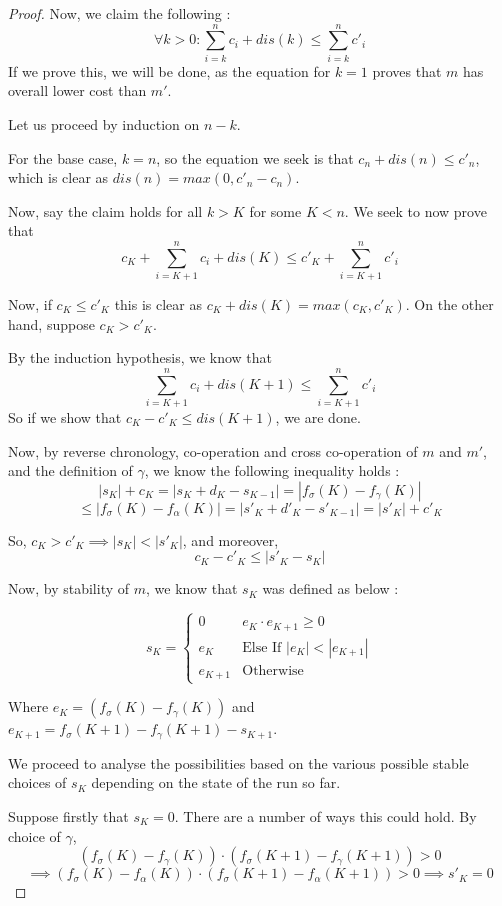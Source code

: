 \documentclass[runningheads]{llncs}
\newcounter{cases}
\begin{document}
\begin{proof}
Now, we claim the following : $$\forall k > 0 : \sum_{i = k}^{n} c_i + dis(k) \leq \sum_{i=k}^{n} c'_i$$
If we prove this, we will be done, as the equation for $k=1$ proves that $m$ has overall lower cost than $m'$. 

Let us proceed by induction on $n-k$. 

For the base case, $k = n$, so the equation we seek is that $c_n + dis(n) \leq c'_n$, which is clear as $dis(n) = max(0, c'_n - c_n)$. 

Now, say the claim holds for all $k > K$ for some $K < n$. We seek to now prove that $$c_K + \sum_{i = K+1}^{n} c_i + dis(K) \leq c'_K + \sum_{i = K+1}^{n} c'_i$$

Now, if $c_K \leq c'_K$ this is clear as $c_K + dis(K) = max(c_K, c'_K)$. On the other hand, suppose $c_K > c'_K$. 

By the induction hypothesis, we know that $$\sum_{i = K+1}^{n} c_i + dis(K+1) \leq \sum_{i = K+1}^{n} c'_i$$ So if we show that $c_K - c'_K \leq dis(K+1)$, we are done. 

Now, by reverse chronology, co-operation and cross co-operation of $m$ and $m'$, and the definition of $\gamma$, we know the following inequality holds : $$|s_{K}| + c_K = |s_K + d_K - s_{K-1}| = |f_\sigma(K) - f_\gamma(K)|$$ $$ \leq |f_\sigma(K) - f_\alpha(K)| =  |s'_K + d'_K - s'_{K-1}| = |s'_{K}| + c'_K$$

So, $c_K > c'_K \implies |s_K| < |s'_K|$, and moreover, $$c_K - c'_K \leq |s'_K - s_K|$$

Now, by stability of $m$, we know that $s_K$ was defined as below : 

$$s_K = \begin{cases}
0 & e_K \cdot e_{K+1} \geq 0 \\
e_K & \textrm{Else If } |e_K| < |e_{K+1}|\\
e_{K+1} & \textrm{Otherwise}
\end{cases}$$

Where $e_K =  (f_\sigma(K) - f_\gamma(K))$ and $e_{K+1} = f_\sigma(K+1) - f_\gamma(K+1) - s_{K+1}$. 

We proceed to analyse the possibilities based on the various possible stable choices of $s_K$ depending on the state of the run so far. 

Suppose firstly that $s_K = 0$. There are a number of ways this could hold. By choice of $\gamma$, $$(f_\sigma(K) - f_\gamma(K))\cdot (f_\sigma(K+1) - f_\gamma(K+1)) > 0 $$$$ \implies (f_\sigma(K) - f_\alpha(K))\cdot (f_\sigma(K+1) - f_\alpha(K+1)) > 0 \implies s'_K = 0$$


\end{proof}
\end{document}

